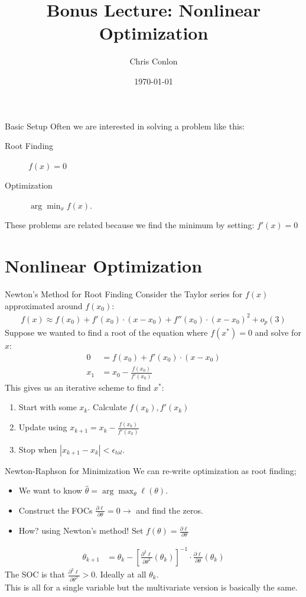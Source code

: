 \documentclass[aspectratio=169,11pt]{beamer}
\title{Bonus Lecture: Nonlinear Optimization}
\author{Chris Conlon  }
\institute{Grad IO}
\date{\today }
\begin{document}
\begin{frame}
\titlepage
\end{frame}

\begin{frame}{Basic Setup}
Often we are interested in solving a problem like this:
\begin{description}
\item[Root Finding] $f(x) = 0 $
\item[Optimization] $\arg \min_x f(x)$.
\end{description}
These problems are related because we find the minimum by setting: $f'(x)=0$
\end{frame}


\section{Nonlinear Optimization}
\begin{frame}{Newton's Method for Root Finding}
Consider the Taylor series for $f(x)$ approximated around $f(x_0)$:
\begin{align*}
f(x) \approx f(x_0) + f'(x_0) \cdot (x-x_0) + f''(x_0) \cdot (x-x_0)^2 + o_p(3)
\end{align*}
Suppose we wanted to find a \alert{root} of the equation where $f(x^{*})=0$ and solve for $x$:
\begin{align*}
0 &= f(x_0) + f'(x_0) \cdot (x-x_0) \\
x_1 &= x_0-\frac{f(x_0)}{f'(x_0)} 
\end{align*}
This gives us an \alert{iterative} scheme to find $x^{*}$:
\begin{enumerate}
\item Start with some $x_k$. Calculate $f(x_k),f'(x_k)$
\item Update using $x_{k+1} = x_k - \frac{f(x_k)}{f'(x_k)} $
\item Stop when $|x_{k+1}-x_{k}| < \epsilon_{tol}$.
\end{enumerate}
\end{frame}

\begin{frame}{Newton-Raphson for Minimization}
We can re-write \alert{optimization} as \alert{root finding};
\begin{itemize}
\item We want to know $\hat{\theta} = \arg \max_{\theta} \ell(\theta)$.
\item Construct the FOCs $\frac{\partial \ell}{\partial \theta}=0 \rightarrow$  and find the zeros.
\item How? using Newton's method! Set $f(\theta) = \frac{\partial \ell}{\partial \theta}$
\end{itemize}
\begin{align*}
\theta_{k+1} &= \theta_k -  \left[ \frac{\partial^2 \ell}{\partial \theta^2}(\theta_k) \right]^{-1} \cdot \frac{\partial \ell}{\partial \theta}(\theta_k)
\end{align*}
The SOC is that $ \frac{\partial^2 \ell}{\partial \theta^2} >0$. Ideally at all $\theta_k$.\\
This is all for a \alert{single variable} but the \alert{multivariate} version is basically the same.
\end{frame}
\end{document}
